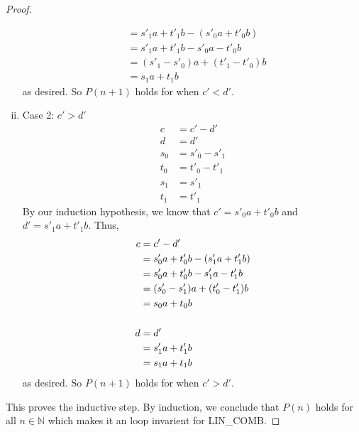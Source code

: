 \documentclass[11pt]{scrartcl}
\begin{document}
\begin{proof}
\begin{enumerate}[i.]
{\begin{align*}
					& = s'_{1} a+t'_{1} b - (s'_0 a  + t'_0b) \\
					& = s'_{1} a+t'_{1} b - s'_0 a  - t'_0b \\
					& = (s'_{1}- s'_0) a + (t'_{1}  - t'_0)b \\
					& = s_1a + t_1b
		      \end{align*}
		      as desired. So $P(n+1)$ holds for when $c'<d'$.
		      }
		\item{
		      Case 2: $c'>d'$
		      \begin{align*}
			      c   & = c' - d'       \\
			      d   & = d'            \\
			      s_0 & = s'_0 - s'_{1} \\
			      t_0 & = t'_0 - t'_1   \\
			      s_1 & = s'_1          \\
			      t_1 & = t'_1
		      \end{align*}
		      By our induction hypothesis, we know that $c' =  s'_0 a  + t'_0b$ and $d'=s'_{1} a+t'_{1} b $. Thus,
		      \begin{align*}
			      c & = c' - d'                                \\
			        & =  s'_0 a  + t'_0b - (s'_{1} a+t'_{1} b) \\
			        & = s'_0 a  + t'_0b - s'_{1} a - t'_{1} b  \\
			        & = (s'_0 - s'_{1})a  + (t'_0  - t'_{1}) b \\
			        & = s_0a  + t_0 b                      \\\-\\
			      d & = d'                                     \\
			        & = s'_{1} a+t'_{1} b                      \\
			        & = s_{1} a+t_{1} b
		      \end{align*}
		      as desired. So $P(n+1)$ holds for when $c'>d'$.
		      }
	\end{enumerate}
	This proves the inductive step.  By induction,  we conclude that $P(n)$ holds for all $n \in \mathbb{N}$ 
	which makes it an loop invarient for LIN\_COMB.

\end{proof}
\end{document}
